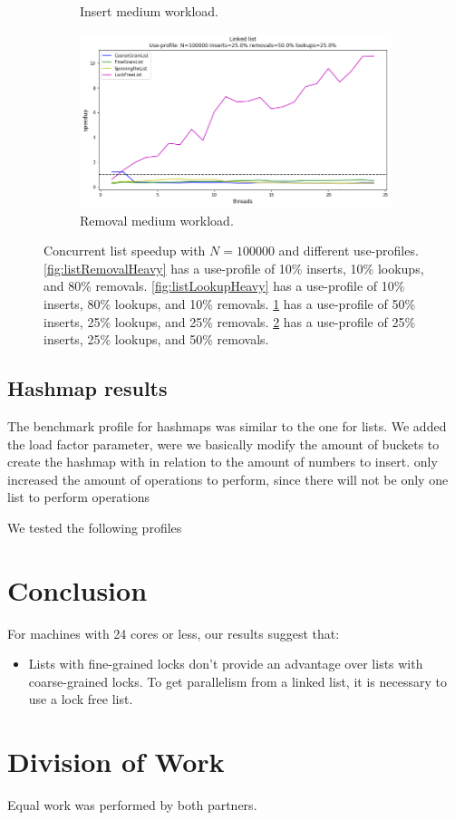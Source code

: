 \documentclass[11pt]{article}
\begin{document}
\begin{figure}[h]
\begin{subfigure}{.6\textwidth}
  \caption{Insert medium workload.}
  \label{fig:listInsertMedium}
\end{subfigure}%
\begin{subfigure}{.6\textwidth}
  \centering
  \includegraphics[width=.8\linewidth]{figs/lateday/combined/lateday_combined_list_insert_25_lookup_25_removal_50}
  \caption{Removal medium workload.}
  \label{fig:listRemovalMedium}
\end{subfigure}
\caption{
Concurrent list speedup with $N=100000$ and different use-profiles.
\ref{fig:listRemovalHeavy} has a use-profile of 10\% inserts, 10\% lookups, and
80\% removals. \ref{fig:listLookupHeavy} has a use-profile of 10\% inserts, 80\%
lookups, and 10\% removals. \ref{fig:listInsertMedium} has a use-profile of 50\%
inserts, 25\% lookups, and 25\% removals. \ref{fig:listRemovalMedium} has a
use-profile of 25\% inserts, 25\% lookups, and 50\% removals.
}
\label{fig:manyLists}
\end{figure}

\subsection{Hashmap results}
The benchmark profile for hashmaps was similar to the one for lists. We added the load factor parameter,
were we basically modify the amount of buckets to create the hashmap with in relation to the
amount of numbers to insert.
only increased the amount of
operations to perform, since there will not be only one list to perform operations

We tested the following profiles

\section{Conclusion}
For machines with 24 cores or less, our results suggest that:
\begin{itemize}
\item
Lists with fine-grained locks don't provide an advantage over lists with
coarse-grained locks. To get parallelism from a linked list, it is necessary to
use a lock free list.
\end{itemize}

\section{Division of Work}
Equal work was performed by both partners.

\printbibliography
\end{document}
